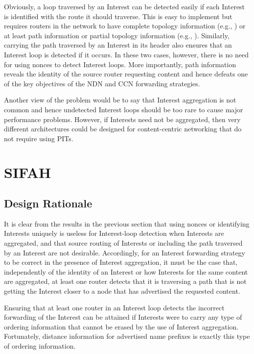 \documentclass{ancs15-alternate}
\begin{document}
Obviously,  a loop  traversed by an Interest can be detected easily if each Interest is identified with the route it should traverse.  
This is easy to implement but  requires routers in the network to have  complete topology information
(e.g., \cite{nlsr, icnp98, vutukury}) or at least path information or partial topology information (e.g., \cite{alva, icnp98}).
Similarly, carrying the path traversed by an Interest in its header also ensures that an Interest loop is detected if it occurs.
In these two cases, however, there is no need for using nonces to detect Interest  loops. More importantly, path information reveals the identity of the source router requesting content and hence defeats one of the key objectives of the NDN and CCN forwarding strategies.

Another view of the problem would be to say that Interest aggregation is not common and hence undetected Interest loops should be too rare to cause major performance problems. However, if Interests need not be aggregated, then very different architectures could be designed for content-centric networking that do not require using PITs.


\section{SIFAH
}
\label{sec-design}

\subsection{Design Rationale}

It is clear from the results in the previous section that using nonces or identifying Interests uniquely is useless for Interest-loop detection when Interests are aggregated, and that source routing of Interests  or including the path traversed by an Interest are not desirable. Accordingly, for an Interest  forwarding strategy to be correct in the presence of Interest aggregation, it must be the case that, independently of the identity of an Interest or how Interests for the same content are  aggregated, at least one router detects that it is  traversing a path that  is not  getting the Interest closer to a node that has advertised the requested content. 

Ensuring that at least one router in an Interest loop detects the incorrect forwarding of the Interest  can be attained if Interests were to carry  any type of ordering information that cannot be erased by the use of Interest aggregation.
Fortunately, distance information for advertised name prefixes is exactly this type of ordering information. 
\end{document}

